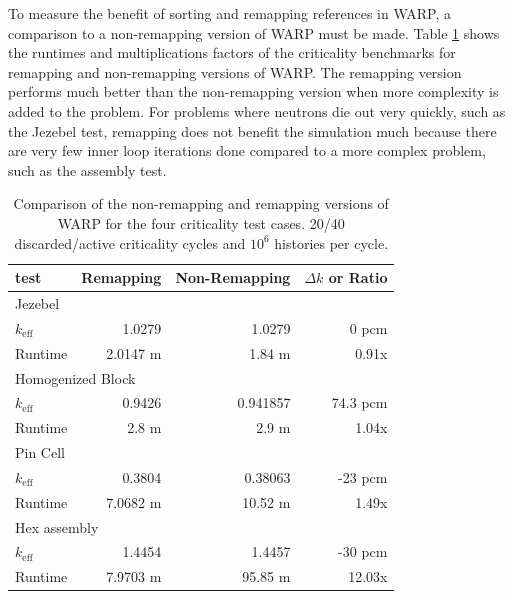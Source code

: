 To measure the benefit of sorting and remapping references in WARP, a comparison to a non-remapping version of WARP must be made.  Table \ref{test_nonremapping_summary} shows the runtimes and multiplications factors of the criticality benchmarks for remapping and non-remapping versions of WARP.  The remapping version performs much better than the non-remapping version when more complexity is added to the problem.  For problems where neutrons die out very quickly, such as the Jezebel test, remapping does not benefit the simulation much because there are very few inner loop iterations done compared to a more complex problem, such as the assembly test.  

\begin{table}[h]
\centering
\caption{Comparison of the non-remapping and remapping versions of WARP for the four criticality test cases.  20/40 discarded/active criticality cycles and $10^6$ histories per cycle.}
\label{test_nonremapping_summary}
\begin{tabular}{| l | r | r | r |}
 \hline
 test & Remapping  & Non-Remapping   & $\Delta k$ or Ratio  \\
\hline
\hline
\multicolumn{4}{|l|}{Jezebel}  \\
\hline
 $k_\mathrm{eff}$ & 1.0279 & 1.0279  & 0 pcm\\
 \hline
 Runtime               &   2.0147 m & 1.84 m & 0.91x \\
 \hline
 \hline
\multicolumn{4}{|l|}{Homogenized Block }\\
\hline
 $k_\mathrm{eff}$ & 0.9426 & 0.941857 & 74.3 pcm  \\
 \hline
 Runtime               &  2.8 m & 2.9 m & 1.04x \\
 \hline
  \hline
\multicolumn{4}{|l|}{Pin Cell}\\
\hline
 $k_\mathrm{eff}$ &  0.3804 & 0.38063  & -23 pcm \\
 \hline
 Runtime               & 7.0682 m & 10.52 m & 1.49x \\
 \hline
  \hline
\multicolumn{4}{|l|}{Hex assembly}\\
\hline
 $k_\mathrm{eff}$  & 1.4454  & 1.4457 & -30 pcm \\
 \hline
 Runtime               & 7.9703 m & 95.85 m & 12.03x \\
 \hline
\end{tabular}
\end{table}

